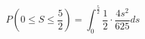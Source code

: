 \documentclass[12pt]{article}
\begin{document}
	\[
		 P(0 \leq S \leq \frac{5}{2}) = \int_{0}^{\frac{5}{2}} \frac{1}{2} \cdot \frac{{4s^2}}{625} ds
	\]
\end{document}
